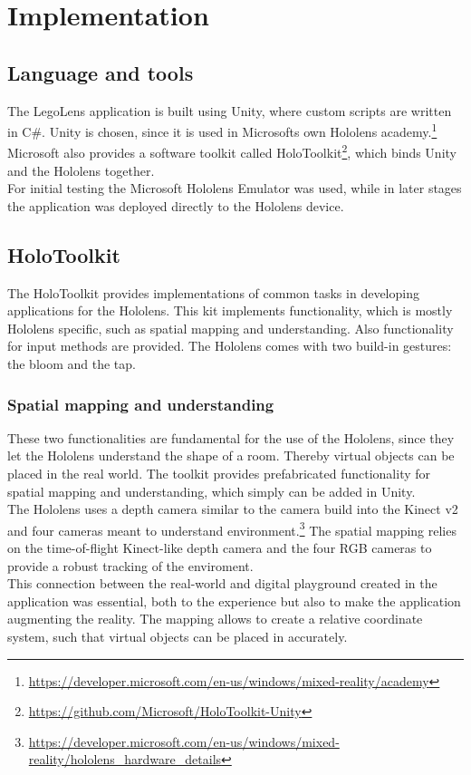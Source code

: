 \section{Implementation}

\subsection{Language and tools}
The LegoLens application is built using Unity, where custom scripts are written in C\#. Unity is chosen, since it is used in Microsofts own Hololens academy.\footnote{\url{https://developer.microsoft.com/en-us/windows/mixed-reality/academy}} Microsoft also provides a software toolkit called HoloToolkit\footnote{\url{https://github.com/Microsoft/HoloToolkit-Unity}}, which binds Unity and the Hololens together. \\
For initial testing the Microsoft Hololens Emulator was used, while in later stages the application was deployed directly to the Hololens device. 

\subsection{HoloToolkit}
The HoloToolkit provides implementations of common tasks in developing applications for the Hololens. This kit implements functionality, which is mostly Hololens specific, such as spatial mapping and understanding. Also functionality for input methods are provided. The Hololens comes with two build-in gestures: the bloom and the tap.

\subsubsection{Spatial mapping and understanding}
These two functionalities are fundamental for the use of the Hololens, since they let the Hololens understand the shape of a room. Thereby virtual objects can be placed in the real world. The toolkit provides prefabricated functionality for spatial mapping and understanding, which simply can be added in Unity.  \\
The Hololens uses a depth camera similar to the camera build into the Kinect v2 and four cameras meant to understand environment.\footnote{\url{https://developer.microsoft.com/en-us/windows/mixed-reality/hololens_hardware_details}} The spatial mapping relies on the time-of-flight Kinect-like depth camera and the four RGB cameras to provide a robust tracking of the enviroment. \\
This connection between the real-world and digital playground created in the application was essential, both to the experience but also to make the application augmenting the reality. The mapping allows to create a relative coordinate system, such that virtual objects can be placed in accurately.

